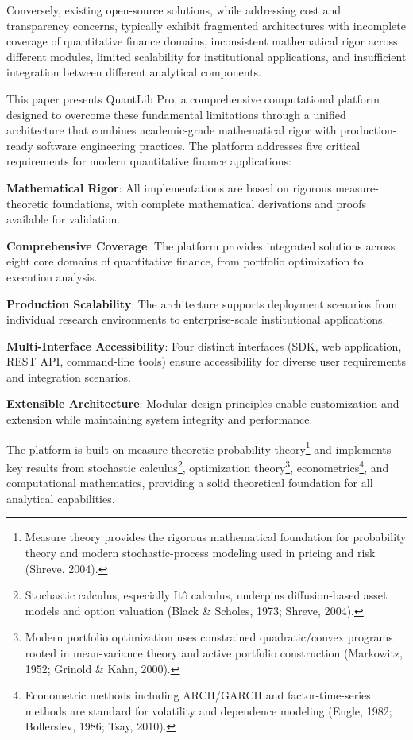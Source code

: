 \documentclass[12pt,a4paper]{article}
\theoremstyle{definition}
\theoremstyle{remark}
\begin{document}
Conversely, existing open-source solutions, while addressing cost and transparency concerns, typically exhibit fragmented architectures with incomplete coverage of quantitative finance domains, inconsistent mathematical rigor across different modules, limited scalability for institutional applications, and insufficient integration between different analytical components.

This paper presents QuantLib Pro, a comprehensive computational platform designed to overcome these fundamental limitations through a unified architecture that combines academic-grade mathematical rigor with production-ready software engineering practices. The platform addresses five critical requirements for modern quantitative finance applications:

\textbf{Mathematical Rigor}: All implementations are based on rigorous measure-theoretic foundations, with complete mathematical derivations and proofs available for validation.

\textbf{Comprehensive Coverage}: The platform provides integrated solutions across eight core domains of quantitative finance, from portfolio optimization to execution analysis.

\textbf{Production Scalability}: The architecture supports deployment scenarios from individual research environments to enterprise-scale institutional applications.

\textbf{Multi-Interface Accessibility}: Four distinct interfaces (SDK, web application, REST API, command-line tools) ensure accessibility for diverse user requirements and integration scenarios.

\textbf{Extensible Architecture}: Modular design principles enable customization and extension while maintaining system integrity and performance.

The platform is built on measure-theoretic probability theory\footnote{Measure theory provides the rigorous mathematical foundation for probability theory and modern stochastic-process modeling used in pricing and risk (Shreve, 2004).} and implements key results from stochastic calculus\footnote{Stochastic calculus, especially Itô calculus, underpins diffusion-based asset models and option valuation (Black \& Scholes, 1973; Shreve, 2004).}, optimization theory\footnote{Modern portfolio optimization uses constrained quadratic/convex programs rooted in mean-variance theory and active portfolio construction (Markowitz, 1952; Grinold \& Kahn, 2000).}, econometrics\footnote{Econometric methods including ARCH/GARCH and factor-time-series methods are standard for volatility and dependence modeling (Engle, 1982; Bollerslev, 1986; Tsay, 2010).}, and computational mathematics, providing a solid theoretical foundation for all analytical capabilities.
\end{document}
